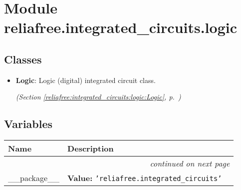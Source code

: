 %
%
%


\section{Module reliafree.integrated\_circuits.logic}

    \label{reliafree:integrated_circuits:logic}


\subsection{Classes}

\begin{itemize}  \setlength{\parskip}{0ex}
  \item \textbf{Logic}: Logic (digital) integrated circuit class.



  \textit{(Section \ref{reliafree:integrated_circuits:logic:Logic}, p.~\pageref{reliafree:integrated_circuits:logic:Logic})}

\end{itemize}


  \subsection{Variables}

    \vspace{-1cm}
\hspace{\varindent}\begin{longtable}{|p{\varnamewidth}|p{\vardescrwidth}|l}
\cline{1-2}
\cline{1-2} \centering \textbf{Name} & \centering \textbf{Description}& \\
\cline{1-2}
\endhead\cline{1-2}\multicolumn{3}{r}{\small\textit{continued on next page}}\\\endfoot\cline{1-2}
\endlastfoot\raggedright \_\-\_\-p\-a\-c\-k\-a\-g\-e\-\_\-\_\- & \raggedright \textbf{Value:} 
{\tt \texttt{'}\texttt{reliafree.integrated\_circuits}\texttt{'}}&\\
\cline{1-2}
\end{longtable}

